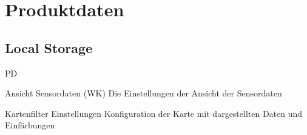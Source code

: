 \section{Produktdaten}

\subsection{Local Storage}
\begin{Kriterien}{PD}

 \item[Ansicht Sensordaten (WK)]
    Die Einstellungen der Ansicht der Sensordaten

 \item[Kartenfilter Einstellungen]
    Konfiguration der Karte mit dargestellten Daten und Einfärbungen

\end{Kriterien}